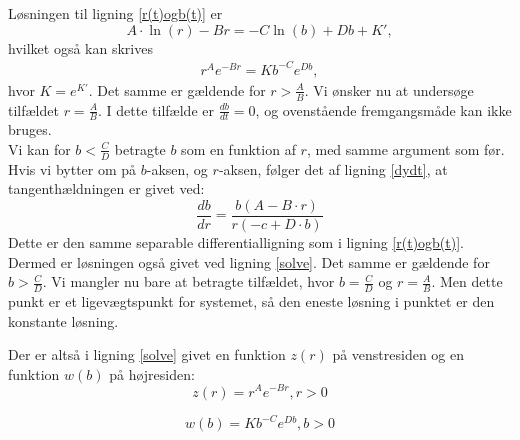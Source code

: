 Løsningen til ligning \eqref{r(t)ogb(t)} er
\begin{equation}\label{mikkel}
   A\cdot \ln(r)-Br=-C\ln(b)+Db+K',
\end{equation}
hvilket også kan skrives
\begin{align}
r^Ae^{-Br}=Kb^{-C}e^{Db},
\label{solve}
\end{align}
hvor $K=e^{K'}$. Det samme er gældende for $r>\frac{A}{B}$. Vi ønsker nu at undersøge tilfældet $r=\frac{A}{B}$. I dette tilfælde er $\frac{db}{dt}=0$, og ovenstående fremgangsmåde kan ikke bruges. \\
 Vi kan for $b<\frac{C}{D}$ betragte $b$ som en funktion af $r$, med samme argument som før. Hvis vi bytter om på $b$-aksen, og $r$-aksen, følger det af ligning \eqref{dydt}, at tangenthældningen er givet ved: $$\frac{db}{dr}=\frac{b(A-B\cdot r)}{r(-c+D\cdot b)}$$
 Dette er den samme separable differentialligning som i ligning \eqref{r(t)ogb(t)}. Dermed er løsningen også givet ved ligning \eqref{solve}. Det samme er gældende for $b>\frac{C}{D}$. Vi mangler nu bare at betragte tilfældet, hvor $b=\frac{C}{D}$ og $r=\frac{A}{B}$. Men dette punkt er et ligevægtspunkt for systemet, så den eneste løsning i punktet er den konstante løsning.
 
 Der er altså i ligning \eqref{solve} givet en funktion $z(r)$ på venstresiden og en funktion $w(b)$ på højresiden:
\begin{equation} \label{zr}
    z(r)=r^Ae^{-Br}, r>0
\end{equation}

\begin{equation} \label{wb}
    w(b)=Kb^{-C}e^{Db}, b>0
\end{equation}
    


